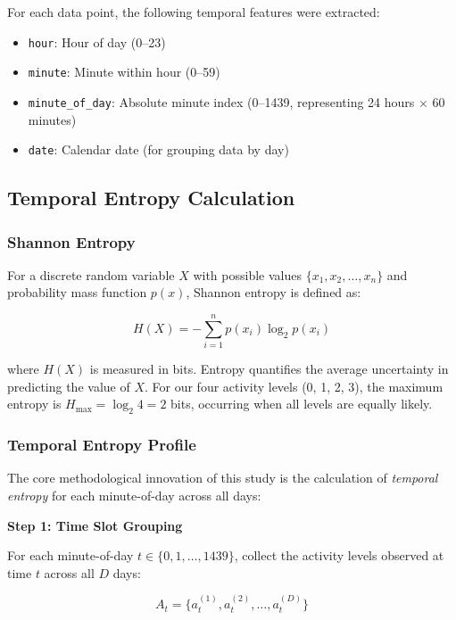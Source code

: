 \documentclass[12pt,letterpaper]{article}
\begin{document}
For each data point, the following temporal features were extracted:
\begin{itemize}
    \item \texttt{hour}: Hour of day (0--23)
    \item \texttt{minute}: Minute within hour (0--59)
    \item \texttt{minute\_of\_day}: Absolute minute index (0--1439, representing 24 hours × 60 minutes)
    \item \texttt{date}: Calendar date (for grouping data by day)
\end{itemize}

\subsection{Temporal Entropy Calculation}

\subsubsection{Shannon Entropy}

For a discrete random variable $X$ with possible values $\{x_1, x_2, \ldots, x_n\}$ and probability mass function $p(x)$, Shannon entropy is defined as:

\begin{equation}
H(X) = -\sum_{i=1}^{n} p(x_i) \log_2 p(x_i)
\end{equation}

where $H(X)$ is measured in bits. Entropy quantifies the average uncertainty in predicting the value of $X$. For our four activity levels (0, 1, 2, 3), the maximum entropy is $H_{\max} = \log_2 4 = 2$ bits, occurring when all levels are equally likely.

\subsubsection{Temporal Entropy Profile}

The core methodological innovation of this study is the calculation of \textit{temporal entropy} for each minute-of-day across all days:

\textbf{Step 1: Time Slot Grouping}

For each minute-of-day $t \in \{0, 1, \ldots, 1439\}$, collect the activity levels observed at time $t$ across all $D$ days:

\begin{equation}
A_t = \{a_t^{(1)}, a_t^{(2)}, \ldots, a_t^{(D)}\}
\end{equation}
\end{document}
